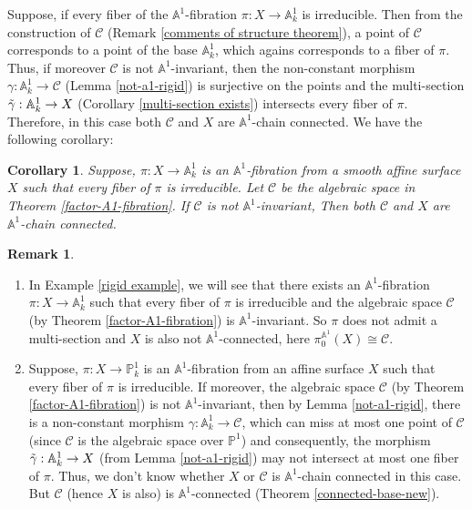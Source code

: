 \documentclass[11pt, reqno]{amsart}
\theoremstyle{plain}
\newtheorem{corollary}[thm]{Corollary}
\theoremstyle{definition}
\newtheorem{remark}[thm]{Remark}
\newcommand{\sC}{{\mathcal C}}
\newcommand{\A}{{\mathbb A}}
\renewcommand{\P}{{\mathbb P}}
\begin{document}
Suppose, if every fiber of the $\mathbb{A}^1$-fibration $\pi: X \to \mathbb{A}^1_k$ is irreducible.
Then from the construction of $\sC$ (Remark \ref{comments of structure theorem}),
a point of $\mathcal{C}$ corresponds to a point of the base $\mathbb{A}^1_k$, which agains corresponds to a fiber of $\pi$. Thus, if moreover $\mathcal{C}$ is not $\mathbb{A}^1$-invariant, then the non-constant morphism $\gamma: \mathbb{A}^1_k \to \mathcal{C}$ (Lemma \ref{not-a1-rigid}) is surjective on the points and the multi-section $\Tilde{\gamma}: \mathbb{A}^1_k \to X$ (Corollary \ref{multi-section exists}) intersects every fiber of $\pi$. Therefore, in this case both $\mathcal{C}$ and $X$ are $\mathbb{A}^1$-chain connected. We have the following corollary:
\begin{corollary}\label{irred-fibers}
			Suppose, $\pi:X \to \mathbb{A}^1_k$ is an $\mathbb{A}^1$-fibration from a smooth affine surface $X$ such that every fiber of $\pi$ is irreducible.  
Let $\sC$ be the algebraic space in Theorem \ref{factor-A1-fibration}. If $\sC$ is not $\A^1$-invariant, 
			Then both $\sC$ and $X$ are $\A^1$-chain connected. 
\end{corollary}
\begin{remark}
\begin{enumerate}
   \item In Example \ref{rigid example}, we will see that there exists an $\A^1$-fibration $\pi: X \to \A^1_k$ such that every fiber of $\pi$ is irreducible and the algebraic space $\sC$ (by Theorem \ref{factor-A1-fibration}) is $\A^1$-invariant. So $\pi$ does not admit a multi-section and $X$ is also not $\A^1$-connected, here $\pi_0^{\A^1}(X) \cong \sC$.
 \item   Suppose, $\pi: X \to \P^1_k$ is an $\A^1$-fibration from an affine surface $X$ such that every fiber of $\pi$ is irreducible. If moreover, the algebraic space $\sC$ (by Theorem \ref{factor-A1-fibration}) is not $\A^1$-invariant, then by Lemma \ref{not-a1-rigid}, there is a non-constant morphism $\gamma: \A^1_k \to \sC$, which can miss at most one point of $\sC$ (since $\sC$ is the algebraic space over $\P^1$) and consequently, the morphism $\Tilde{\gamma}: \A^1_k \to X$ (from Lemma \ref{not-a1-rigid}) may not intersect at most one fiber of $\pi$. Thus, we don't know whether $X$ or $\sC$ is $\A^1$-chain connected in this case. But $\sC$ (hence $X$ is also) is $\A^1$-connected (Theorem \ref{connected-base-new}).
 \end{enumerate}
\end{remark}
\end{document}
